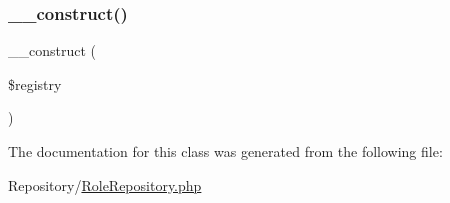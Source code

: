 \subsubsection{\texorpdfstring{\_\_construct()}{\_\_construct()}}
{\footnotesize\ttfamily \+\_\+\+\_\+construct (\begin{DoxyParamCaption}\item[{Registry\+Interface}]{\$registry }\end{DoxyParamCaption})}



The documentation for this class was generated from the following file\+:\begin{DoxyCompactItemize}
\item 
Repository/\mbox{\hyperlink{_role_repository_8php}{Role\+Repository.\+php}}\end{DoxyCompactItemize}
